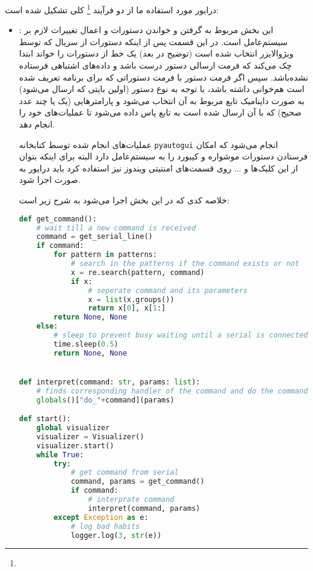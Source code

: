 \documentclass{article}
\begin{document}
درایور مورد استفاده ما از دو فرآیند \footnote{} کلی تشکیل شده است:

\begin{itemize}
	\item {}: این بخش مربوط به گرفتن و خواندن دستورات و اعمال تغییرات لازم بر سیستم‌عامل است.
	در این قسمت پس از اینکه دستورات از سریال که توسط ویژوالایزر انتخاب شده است (توضیح در بعد) یک خط از دستورات را خواند ابتدا چک می‌کند که فرمت ارسالی دستور درست باشد و داده‌های اشتباهی فرستاده نشده‌باشد. سپس اگر فرمت دستور با فرمت دستوراتی که برای برنامه تعریف شده است هم‌خوانی داشته باشد، با توجه به نوع دستور (اولین بایتی که ارسال می‌شود) به صورت داینامیک تابع مربوط به آن انتخاب می‌شود و پارامترهایی (یک یا چند عدد صحیح) که با آن ارسال شده است به تابع پاس داده می‌شود تا عملیات‌های خود را انجام دهد.
	
	عملیات‌های انجام شده توسط کتابخانه
	\verb~pyautogui~ انجام می‌شود که امکان فرستادن دستورات موشواره و کیبورد را به سیستم‌عامل دارد البته برای اینکه بتوان از این کلیک‌ها و ... روی قسمت‌های امنتیتی ویندوز نیز استفاده کرد باید درایور به صورت  اجرا شود. \cite{gui-osk}
	
	خلاصه کدی که در این بخش اجرا می‌شود به شرح زیر است:
\begin{latin}
\begin{lstlisting}[language=python]
def get_command():
    # wait till a new command is received
    command = get_serial_line()
    if command:
        for pattern in patterns:
            # search in the patterns if the command exists or not
            x = re.search(pattern, command)
            if x:
                # seperate command and its parameters
                x = list(x.groups())
                return x[0], x[1:]
        return None, None
    else:
        # sleep to prevent busy waiting until a serial is connected
        time.sleep(0.5)
        return None, None


def interpret(command: str, params: list):
    # finds corresponding handler of the command and do the command
    globals()["do_"+command](params)

def start():
    global visualizer
    visualizer = Visualizer()
    visualizer.start()
    while True:
        try:
            # get command from serial
            command, params = get_command()
            if command:
                # interprate command
                interpret(command, params)
        except Exception as e:
            # log bad habits
            logger.log(3, str(e))
\end{lstlisting}	
\end{latin}


\end{itemize}
\end{document}
